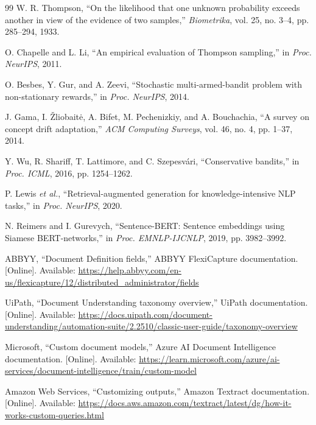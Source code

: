 \documentclass[conference,a4paper]{IEEEtran}
\begin{document}
\begin{thebibliography}{99}
 W. R. Thompson, ``On the likelihood that one unknown probability exceeds another in view of the evidence of two samples,'' \emph{Biometrika}, vol. 25, no. 3--4, pp. 285--294, 1933.

 O. Chapelle and L. Li, ``An empirical evaluation of Thompson sampling,'' in \emph{Proc. NeurIPS}, 2011.

 O. Besbes, Y. Gur, and A. Zeevi, ``Stochastic multi-armed-bandit problem with non-stationary rewards,'' in \emph{Proc. NeurIPS}, 2014.

 J. Gama, I. \v{Z}liobait\.{e}, A. Bifet, M. Pechenizkiy, and A. Bouchachia, ``A survey on concept drift adaptation,'' \emph{ACM Computing Surveys}, vol. 46, no. 4, pp. 1--37, 2014.

 Y. Wu, R. Shariff, T. Lattimore, and C. Szepesv\'ari, ``Conservative bandits,'' in \emph{Proc. ICML}, 2016, pp. 1254--1262.

 P. Lewis \emph{et al.}, ``Retrieval-augmented generation for knowledge-intensive NLP tasks,'' in \emph{Proc. NeurIPS}, 2020.

 N. Reimers and I. Gurevych, ``Sentence-BERT: Sentence embeddings using Siamese BERT-networks,'' in \emph{Proc. EMNLP-IJCNLP}, 2019, pp. 3982--3992.

 ABBYY, ``Document Definition fields,'' ABBYY FlexiCapture documentation. [Online]. Available: \url{https://help.abbyy.com/en-us/flexicapture/12/distributed_administrator/fields}

 UiPath, ``Document Understanding taxonomy overview,'' UiPath documentation. [Online]. Available: \url{https://docs.uipath.com/document-understanding/automation-suite/2.2510/classic-user-guide/taxonomy-overview}

 Microsoft, ``Custom document models,'' Azure AI Document Intelligence documentation. [Online]. Available: \url{https://learn.microsoft.com/azure/ai-services/document-intelligence/train/custom-model}

 Amazon Web Services, ``Customizing outputs,'' Amazon Textract documentation. [Online]. Available: \url{https://docs.aws.amazon.com/textract/latest/dg/how-it-works-custom-queries.html}
\end{thebibliography}
\end{document}
